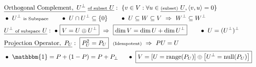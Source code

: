 \documentclass[12pt]{article}
\newcommand{\tss}[1]{\text{\scriptsize #1}} %
\begin{document}
\vspace{10pt}
\(
	\begin{aligned}
		& \underline{ \text{Orthogonal Complement},\ U^\perp } \ \underline{ \tss{of subset}\ U }:\ 
			\{ v \in V: \forall u \in \underline{ \tss{(subset)}\ U }, \langle v, u \rangle = 0  \}
			\\
		& \bullet\ U^\perp\ \tss{is Subspace}
			\hspace{20pt} \bullet\ U \cap U^\perp \subseteq \{0\}
			\hspace{20pt} \bullet\ U \subseteq W \subseteq V \ \Rightarrow\ W^\perp \subseteq W^\perp 
			\\
		& \underline{ U^\perp\ \tss{of subspace}\ U }: \ \bullet\ \boxed{ V = U \oplus U^\perp}
			\ \Rightarrow\ \boxed{ \dim V = \dim U + \dim U^\perp }
			\hspace{20pt} \bullet\ U = (U^\perp)^\perp
			\\
		& \underline{ \text{Projection Operator},\ P_U }:\ \boxed{P_U^2 = P_U} \ \ \tss{(Idempotent)} 
			\ \Rightarrow\ PU = U
			\\
		& \bullet\ \mathbbm{1} = P + (1 - P) = P + P_\perp
			\hspace{15pt} \bullet\ \boxed{ V = \left[ U = \text{range}(P_U) \right] \oplus \left[ U^\perp = \text{null}(P_U) \right] }
			\\
	\end{aligned}
\)
\end{document}
